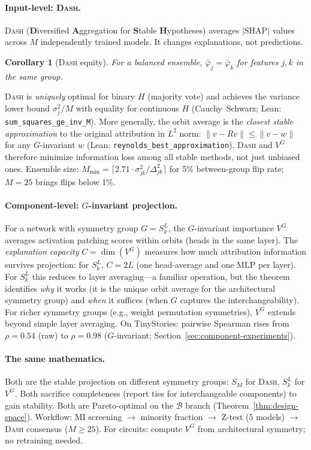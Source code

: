 \documentclass{article}
\newtheorem{corollary}[theorem]{Corollary}
\newcommand{\SHAP}{\mathrm{SHAP}}
\newcommand{\DASH}{\textsc{Dash}}
\begin{document}
\paragraph{Input-level: \DASH{}.}
\DASH{} (\textbf{D}iversified \textbf{A}ggregation for \textbf{S}table \textbf{H}ypotheses) averages $|\SHAP|$ values across $M$ independently trained models. It changes explanations, not predictions.

\begin{corollary}[\DASH{} equity]
\label{cor:equity}
For a balanced ensemble, $\bar\varphi_j = \bar\varphi_k$ for features $j, k$ in the same group.
\end{corollary}

\DASH{} is \emph{uniquely} optimal for binary $H$ (majority vote) and achieves the variance lower bound $\sigma_j^2/M$ with equality for continuous $H$ (Cauchy--Schwarz; Lean: \texttt{sum\_squares\_ge\_inv\_M}). More generally, the orbit average is the \emph{closest stable approximation} to the original attribution in $L^2$ norm: $\|v - Rv\| \leq \|v - w\|$ for any $G$-invariant $w$ (Lean: \texttt{reynolds\_best\_approximation}). \DASH{} and $V^G$ therefore minimize information loss among all stable methods, not just unbiased ones.
Ensemble size: $M_{\min} = \lceil 2.71 \cdot \sigma_{jk}^2/\Delta_{jk}^2 \rceil$ for 5\% between-group flip rate; $M = 25$ brings flips below 1\%.

\paragraph{Component-level: $G$-invariant projection.}
For a network with symmetry group $G = S_k^L$, the $G$-invariant importance $V^G$ averages activation patching scores within orbits (heads in the same layer). The \emph{explanation capacity} $C = \dim(V^G)$ measures how much attribution information survives projection: for $S_k^L$, $C = 2L$ (one head-average and one MLP per layer). For $S_k^L$ this reduces to layer averaging---a familiar operation, but the theorem identifies \emph{why} it works (it is the unique orbit average for the architectural symmetry group) and \emph{when} it suffices (when $G$ captures the interchangeability). For richer symmetry groups (e.g., weight permutation symmetries), $V^G$ extends beyond simple layer averaging. On TinyStories: pairwise Spearman rises from $\rho = 0.54$ (raw) to $\rho = 0.98$ ($G$-invariant; Section~\ref{sec:component-experiments}).

\paragraph{The same mathematics.}
Both are the stable projection on different symmetry groups: $S_M$ for \DASH{}, $S_k^L$ for $V^G$. Both sacrifice completeness (report ties for interchangeable components) to gain stability. Both are Pareto-optimal on the $\mathcal{B}$ branch (Theorem~\ref{thm:design-space}). Workflow: MI screening $\to$ minority fraction $\to$ Z-test (5 models) $\to$ \DASH{} consensus ($M \geq 25$). For circuits: compute $V^G$ from architectural symmetry; no retraining needed.
\end{document}
